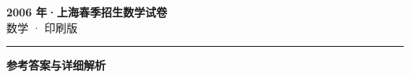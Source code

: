 \documentclass[zihao=5, a4paper]{ctexart}
\begin{document}
\begin{center}
  {\Large\bfseries 2006 年·上海春季招生数学试卷}\\[4pt]
  {\large 数学 · 印刷版}
\end{center}
\medskip
{}

\par\bigskip\hrule\bigskip
{}
\begin{center}{\large\bfseries 参考答案与详细解析}\end{center}
\smallskip

\end{document}
